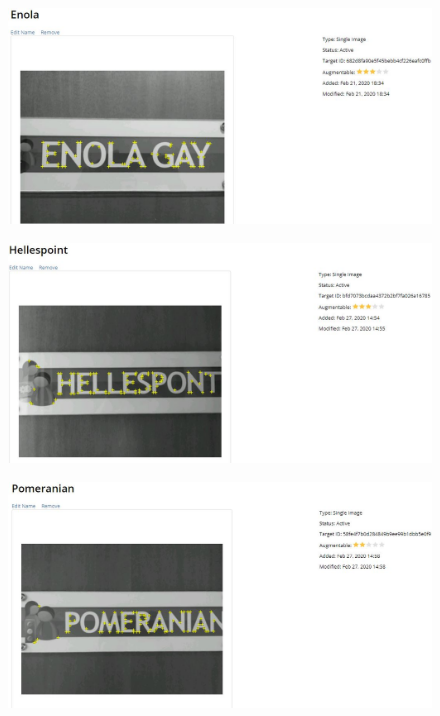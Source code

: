 \documentclass{aifyp}
\begin{document}
\begin{appendices}
\begin{figure}[H]
\begin{minipage}{.5\textwidth}
          \label{fig:BrittanicImageTarget}
        \end{minipage}%
        \begin{minipage}{.5\textwidth}
          \centering
          \includegraphics[scale=0.3]{Images/Chapter6/EnolaImageTarget.JPG}
          \label{fig:EnolaImageTarget}
        \end{minipage}
\end{figure}
\begin{figure}[H]
    \centering
        \begin{minipage}{.5\textwidth}
          \centering
          \includegraphics[scale=0.3]{Images/Chapter6/HellespontImageTarget.JPG}
          \label{fig:HellespontImageTarget}
        \end{minipage}%
        \begin{minipage}{.5\textwidth}
          \centering
          \includegraphics[scale=0.3]{Images/Chapter6/PomeranianImageTarget.JPG}

\end{minipage}
\end{figure}
\end{appendices}
\end{document}
